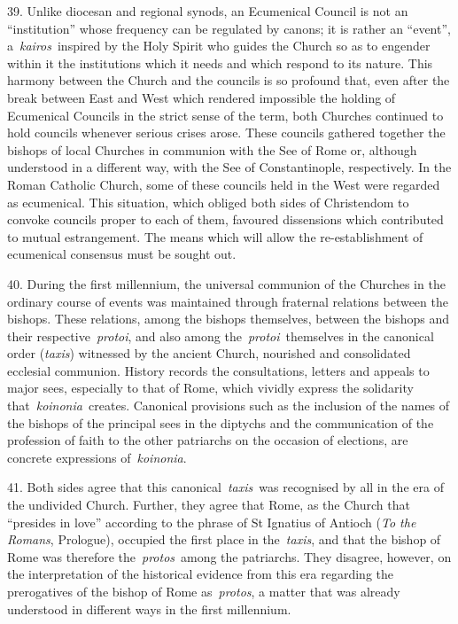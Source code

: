 39. Unlike diocesan and regional synods, an Ecumenical Council is not an
``institution'' whose frequency can be regulated by canons; it is rather
an ``event'', a~\emph{kairos}~inspired by the Holy Spirit who guides the
Church so as to engender within it the institutions which it needs and
which respond to its nature. This harmony between the Church and the
councils is so profound that, even after the break between East and West
which rendered impossible the holding of Ecumenical Councils in the
strict sense of the term, both Churches continued to hold councils
whenever serious crises arose. These councils gathered together the
bishops of local Churches in communion with the See of Rome or, although
understood in a different way, with the See of Constantinople,
respectively. In the Roman Catholic Church, some of these councils held
in the West were regarded as ecumenical. This situation, which obliged
both sides of Christendom to convoke councils proper to each of them,
favoured dissensions which contributed to mutual estrangement. The means
which will allow the re-establishment of ecumenical consensus must be
sought out.

40. During the first millennium, the universal communion of the Churches
in the ordinary course of events was maintained through fraternal
relations between the bishops. These relations, among the bishops
themselves, between the bishops and their respective~\emph{protoi}, and
also among the~\emph{protoi}~themselves in the canonical order
(\emph{taxis}) witnessed by the ancient Church, nourished and
consolidated ecclesial communion. History records the consultations,
letters and appeals to major sees, especially to that of Rome, which
vividly express the solidarity that~\emph{koinonia~}creates. Canonical
provisions such as the inclusion of the names of the bishops of the
principal sees in the diptychs and the communication of the profession
of faith to the other patriarchs on the occasion of elections, are
concrete expressions of~\emph{koinonia}.

41. Both sides agree that this canonical~\emph{taxis}~was recognised by
all in the era of the undivided Church. Further, they agree that Rome,
as the Church that ``presides in love'' according to the phrase of St
Ignatius of Antioch (\emph{To the Romans}, Prologue), occupied the first
place in the~\emph{taxis}, and that the bishop of Rome was therefore
the~\emph{protos}~among the patriarchs. They disagree, however, on the
interpretation of the historical evidence from this era regarding the
prerogatives of the bishop of Rome as~\emph{protos}, a matter that was
already understood in different ways in the first millennium.

